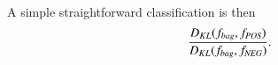 
A simple straightforward classification is then
\begin{align}
  \frac{D_{KL} (f_{bag},f_{\text{\scriptsize{{\it POS}}}})}{D_{KL} (f_{bag},f_{\text{\scriptsize{{\it NEG}}}})}.
\end{align}



